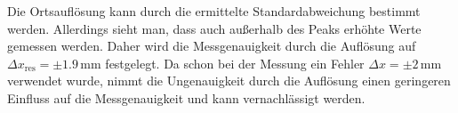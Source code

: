 \documentclass[12pt,a4paper]{scrartcl}
\numberwithin{equation}{section} %
\renewcommand{\[}{} %
\renewcommand{\]}{\noindent} %
\begin{document}


\noindent
Die Ortsauflösung kann durch die ermittelte Standardabweichung bestimmt werden. Allerdings sieht man, dass auch außerhalb des Peaks erhöhte Werte gemessen werden. Daher wird die Messgenauigkeit durch die Auflösung auf $\Delta x_\mathrm{res}=\pm 1.9\,\mathrm{mm}$ festgelegt. Da schon bei der Messung ein Fehler $\Delta x=\pm 2\,\mathrm{mm}$ verwendet wurde, nimmt die Ungenauigkeit durch die Auflösung einen geringeren Einfluss auf die Messgenauigkeit und kann vernachlässigt werden.
\end{document}
